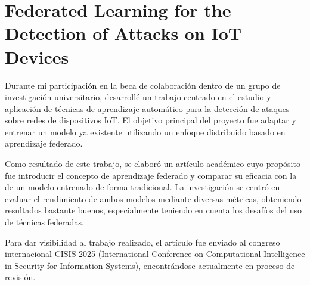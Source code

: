 \section*{Federated Learning for the Detection of Attacks on IoT Devices}
\label{sec:articulo_academico}
Durante mi participación en la beca de colaboración dentro de un grupo de investigación universitario, desarrollé un trabajo centrado en el estudio y aplicación de técnicas de aprendizaje automático para la detección de ataques sobre redes de dispositivos IoT. El objetivo principal del proyecto fue adaptar y entrenar un modelo ya existente utilizando un enfoque distribuido basado en aprendizaje federado.

Como resultado de este trabajo, se elaboró un artículo académico cuyo propósito fue introducir el concepto de aprendizaje federado y comparar su eficacia con la de un modelo entrenado de forma tradicional. La investigación se centró en evaluar el rendimiento de ambos modelos mediante diversas métricas, obteniendo resultados bastante buenos, especialmente teniendo en cuenta los desafíos del uso de técnicas federadas.

Para dar visibilidad al trabajo realizado, el artículo fue enviado al congreso internacional CISIS 2025 (International Conference on Computational Intelligence in Security for Information Systems), encontrándose actualmente en proceso de revisión.
